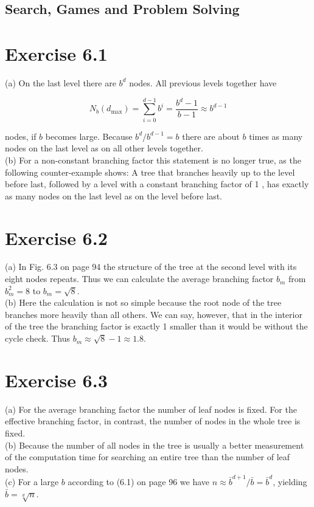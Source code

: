 \documentclass[10pt]{book}
\begin{document}
\subsection*{Search, Games and Problem Solving}
\section*{Exercise 6.1}
(a) On the last level there are $b^{d}$ nodes. All previous levels together have

$$
N_{b}\left(d_{\max }\right)=\sum_{i=0}^{d-1} b^{i}=\frac{b^{d}-1}{b-1} \approx b^{d-1}
$$

nodes, if $b$ becomes large. Because $b^{d} / b^{d-1}=b$ there are about $b$ times as many nodes on the last level as on all other levels together.\\
(b) For a non-constant branching factor this statement is no longer true, as the following counter-example shows: A tree that branches heavily up to the level before last, followed by a level with a constant branching factor of 1 , has exactly as many nodes on the last level as on the level before last.

\section*{Exercise 6.2}
(a) In Fig. 6.3 on page 94 the structure of the tree at the second level with its eight nodes repeats. Thus we can calculate the average branching factor $b_{m}$ from $b_{m}^{2}=8$ to $b_{m}=\sqrt{8}$.\\
(b) Here the calculation is not so simple because the root node of the tree branches more heavily than all others. We can say, however, that in the interior of the tree the branching factor is exactly 1 smaller than it would be without the cycle check. Thus $b_{m} \approx \sqrt{8}-1 \approx 1.8$.

\section*{Exercise 6.3}
(a) For the average branching factor the number of leaf nodes is fixed. For the effective branching factor, in contrast, the number of nodes in the whole tree is fixed.\\
(b) Because the number of all nodes in the tree is usually a better measurement of the computation time for searching an entire tree than the number of leaf nodes.\\
(c) For a large $b$ according to (6.1) on page 96 we have $n \approx \bar{b}^{d+1} / \bar{b}=\bar{b}^{d}$, yielding $\bar{b}=\sqrt[d]{n}$.
\end{document}
